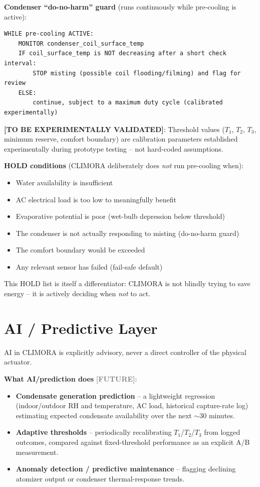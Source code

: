 \documentclass[11pt,a4paper]{article}
\newcommand{\tobevalidated}{\textcolor{red!70!black}{\textbf{[TO BE EXPERIMENTALLY VALIDATED]}}}
\newcommand{\future}{\textcolor{gray}{\textbf{[FUTURE]}}}
\begin{document}
\textbf{Condenser ``do-no-harm'' guard} (runs continuously while pre-cooling is active):
\begin{verbatim}
WHILE pre-cooling ACTIVE:
    MONITOR condenser_coil_surface_temp
    IF coil_surface_temp is NOT decreasing after a short check interval:
        STOP misting (possible coil flooding/filming) and flag for review
    ELSE:
        continue, subject to a maximum duty cycle (calibrated experimentally)
\end{verbatim}

\tobevalidated: Threshold values ($T_1$, $T_2$, $T_3$, minimum reserve, comfort boundary) are calibration parameters established experimentally during prototype testing -- not hard-coded assumptions.

\textbf{HOLD conditions} (CLIMORA deliberately does \emph{not} run pre-cooling when):
\begin{itemize}[nosep]
    \item Water availability is insufficient
    \item AC electrical load is too low to meaningfully benefit
    \item Evaporative potential is poor (wet-bulb depression below threshold)
    \item The condenser is not actually responding to misting (do-no-harm guard)
    \item The comfort boundary would be exceeded
    \item Any relevant sensor has failed (fail-safe default)
\end{itemize}

\begin{keyidea}
This HOLD list is itself a differentiator: CLIMORA is not blindly trying to save energy -- it is actively deciding when \emph{not} to act.
\end{keyidea}

\section{AI / Predictive Layer}
\label{sec:ai}

AI in CLIMORA is explicitly advisory, never a direct controller of the physical actuator.

\textbf{What AI/prediction does} \future:
\begin{itemize}
    \item \textbf{Condensate generation prediction} -- a lightweight regression (indoor/outdoor RH and temperature, AC load, historical capture-rate log) estimating expected condensate availability over the next $\sim$30 minutes.
    \item \textbf{Adaptive thresholds} -- periodically recalibrating $T_1$/$T_2$/$T_3$ from logged outcomes, compared against fixed-threshold performance as an explicit A/B measurement.
    \item \textbf{Anomaly detection / predictive maintenance} -- flagging declining atomizer output or condenser thermal-response trends.
\end{itemize}
\end{document}
